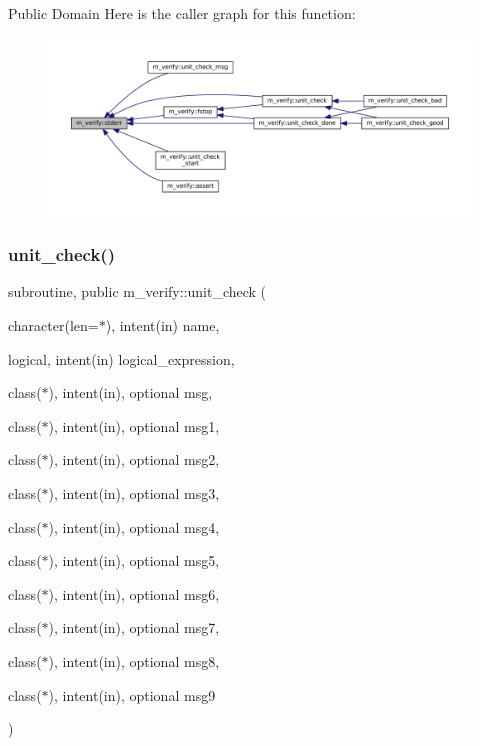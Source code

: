 Public Domain Here is the caller graph for this function\+:\nopagebreak
\begin{figure}[H]
\begin{center}
\leavevmode
\includegraphics[width=350pt]{namespacem__verify_a41f795f932767c97b5ef481a694f4f84_icgraph}
\end{center}
\end{figure}
\mbox{\label{namespacem__verify_a96149da1a302f2a157d79dadc94e755e}} 
\subsubsection{\texorpdfstring{unit\+\_\+check()}{unit\_check()}}
{\footnotesize\ttfamily subroutine, public m\+\_\+verify\+::unit\+\_\+check (\begin{DoxyParamCaption}\item[{character(len=$\ast$), intent(in)}]{name,  }\item[{logical, intent(in)}]{logical\+\_\+expression,  }\item[{class($\ast$), intent(in), optional}]{msg,  }\item[{class($\ast$), intent(in), optional}]{msg1,  }\item[{class($\ast$), intent(in), optional}]{msg2,  }\item[{class($\ast$), intent(in), optional}]{msg3,  }\item[{class($\ast$), intent(in), optional}]{msg4,  }\item[{class($\ast$), intent(in), optional}]{msg5,  }\item[{class($\ast$), intent(in), optional}]{msg6,  }\item[{class($\ast$), intent(in), optional}]{msg7,  }\item[{class($\ast$), intent(in), optional}]{msg8,  }\item[{class($\ast$), intent(in), optional}]{msg9 }\end{DoxyParamCaption})}



